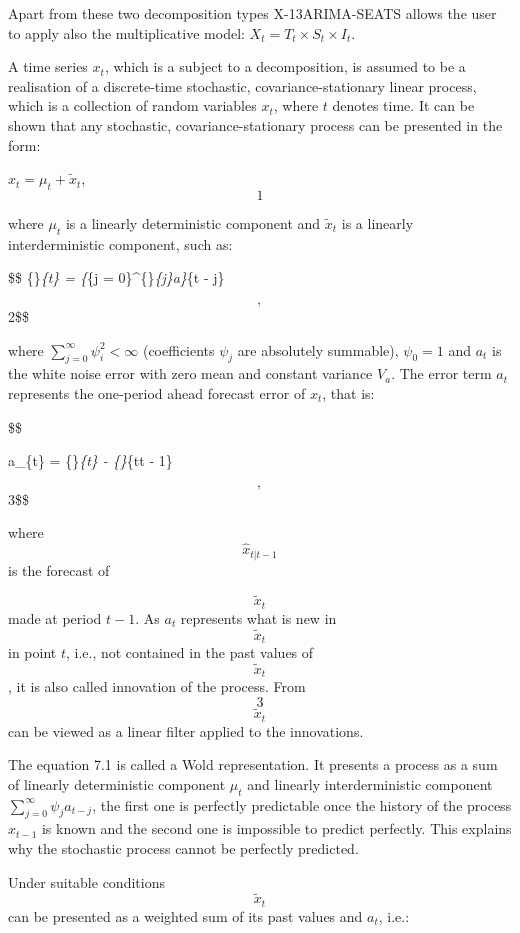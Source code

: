 \documentclass[
  letterpaper,
  DIV=11,
  numbers=noendperiod]{scrreprt}
\begin{document}
Apart from these two decomposition types X-13ARIMA-SEATS allows the user
to apply also the multiplicative model:
\(X_{t} = T_{t} \times S_{t} \times I_{t}\).

A time series \(x_{t}\), which is a subject to a decomposition, is
assumed to be a realisation of a discrete-time stochastic,
covariance-stationary linear process, which is a collection of random
variables \(x_{t}\), where \(t\) denotes time. It can be shown that any
stochastic, covariance-stationary process can be presented in the form:

\(x_{t} = \mu_{t} + {\widetilde{x}}_{t}\), \[1\]

where \(\mu_{t}\) is a linearly deterministic component and
\({\widetilde{x}}_{t}\) is a linearly interderministic component, such
as:

\$\$ \{\}\emph{\{t\} = \{\sum}\{j =
0\}\^{}\{\infty\}\psi\emph{\{j\}a\}}\{t - j\}

\[, \]2\$\$

where \(\sum_{j = 0}^{\infty}\psi_{i}^{2} < \infty\) (coefficients
\(\psi_{j}\) are absolutely summable), \(\psi_{0} = 1\) and \(a_{t}\) is
the white noise error with zero mean and constant variance \(V_{a}\).
The error term \(a_{t}\) represents the one-period ahead forecast error
of \(x_{t}\), that is:

\$\$

a\_\{t\} = \{\}\emph{\{t\} - \{\}}\{t\textbar t
- 1\}

\[, \]3\$\$

where \[{\widehat{x}}_{t|t - 1}\] is the forecast of

\[{\widetilde{x}}_{t}\] made at period \(t - 1\). As \(a_{t}\)
represents what is new in \[{\widetilde{x}}_{t}\] in point \(t\), i.e.,
not contained in the past values of \[{\widetilde{x}}_{t}\], it is also
called innovation of the process. From \[3\] \[{\widetilde{x}}_{t}\] can
be viewed as a linear filter applied to the innovations.

The equation 7.1 is called a Wold representation. It presents a process
as a sum of linearly deterministic component \(\mu_{t}\) and linearly
interderministic component \(\sum_{j = 0}^{\infty}\psi_{j}a_{t - j}\),
the first one is perfectly predictable once the history of the process
\(x_{t - 1}\) is known and the second one is impossible to predict
perfectly. This explains why the stochastic process cannot be perfectly
predicted.

Under suitable conditions \[{\widetilde{x}}_{t}\] can be presented as a
weighted sum of its past values and \(a_{t}\), i.e.:
\end{document}
